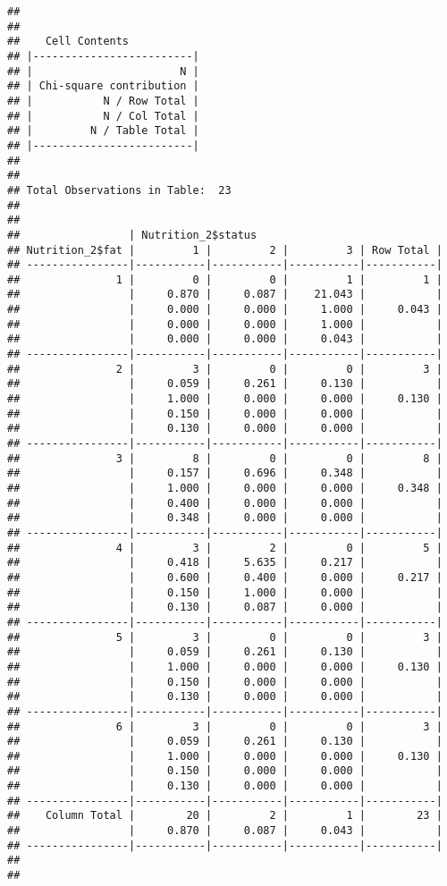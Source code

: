 \documentclass[
]{article}
\begin{document}
\begin{verbatim}
## 
##  
##    Cell Contents
## |-------------------------|
## |                       N |
## | Chi-square contribution |
## |           N / Row Total |
## |           N / Col Total |
## |         N / Table Total |
## |-------------------------|
## 
##  
## Total Observations in Table:  23 
## 
##  
##                 | Nutrition_2$status 
## Nutrition_2$fat |         1 |         2 |         3 | Row Total | 
## ----------------|-----------|-----------|-----------|-----------|
##               1 |         0 |         0 |         1 |         1 | 
##                 |     0.870 |     0.087 |    21.043 |           | 
##                 |     0.000 |     0.000 |     1.000 |     0.043 | 
##                 |     0.000 |     0.000 |     1.000 |           | 
##                 |     0.000 |     0.000 |     0.043 |           | 
## ----------------|-----------|-----------|-----------|-----------|
##               2 |         3 |         0 |         0 |         3 | 
##                 |     0.059 |     0.261 |     0.130 |           | 
##                 |     1.000 |     0.000 |     0.000 |     0.130 | 
##                 |     0.150 |     0.000 |     0.000 |           | 
##                 |     0.130 |     0.000 |     0.000 |           | 
## ----------------|-----------|-----------|-----------|-----------|
##               3 |         8 |         0 |         0 |         8 | 
##                 |     0.157 |     0.696 |     0.348 |           | 
##                 |     1.000 |     0.000 |     0.000 |     0.348 | 
##                 |     0.400 |     0.000 |     0.000 |           | 
##                 |     0.348 |     0.000 |     0.000 |           | 
## ----------------|-----------|-----------|-----------|-----------|
##               4 |         3 |         2 |         0 |         5 | 
##                 |     0.418 |     5.635 |     0.217 |           | 
##                 |     0.600 |     0.400 |     0.000 |     0.217 | 
##                 |     0.150 |     1.000 |     0.000 |           | 
##                 |     0.130 |     0.087 |     0.000 |           | 
## ----------------|-----------|-----------|-----------|-----------|
##               5 |         3 |         0 |         0 |         3 | 
##                 |     0.059 |     0.261 |     0.130 |           | 
##                 |     1.000 |     0.000 |     0.000 |     0.130 | 
##                 |     0.150 |     0.000 |     0.000 |           | 
##                 |     0.130 |     0.000 |     0.000 |           | 
## ----------------|-----------|-----------|-----------|-----------|
##               6 |         3 |         0 |         0 |         3 | 
##                 |     0.059 |     0.261 |     0.130 |           | 
##                 |     1.000 |     0.000 |     0.000 |     0.130 | 
##                 |     0.150 |     0.000 |     0.000 |           | 
##                 |     0.130 |     0.000 |     0.000 |           | 
## ----------------|-----------|-----------|-----------|-----------|
##    Column Total |        20 |         2 |         1 |        23 | 
##                 |     0.870 |     0.087 |     0.043 |           | 
## ----------------|-----------|-----------|-----------|-----------|
## 
## 
\end{verbatim}
\end{document}
